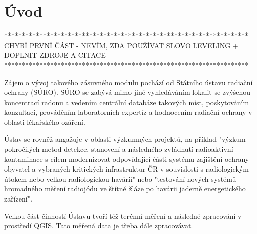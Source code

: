 \chapter{Úvod}
\label{1-uvod}

*********************************************************************
CHYBÍ PRVNÍ ČÁST - NEVÍM, ZDA POUŽÍVAT SLOVO LEVELING + DOPLNIT ZDROJE A CITACE
*********************************************************************

Zájem o vývoj takového zásuvného modulu pochází od Státního ústavu radiační ochrany (SÚRO). SÚRO se zabývá mimo jiné vyhledáváním lokalit se zvýšenou koncentrací radonu a vedením centrální databáze takových míst, poskytováním konzultací, prováděním laboratorních expertíz a hodnocením radiační ochrany v oblasti lékařského ozáření. 

Ústav se rovněž angažuje v oblasti výzkumných projektů, na příklad "výzkum pokročilých metod detekce, stanovení a následného zvládnutí radioaktivní kontaminace s cílem modernizovat odpovídající části systému zajištění ochrany obyvatel a vybraných kritických infrastruktur ČR v souvislosti s radiologickým útokem nebo velkou radiologickou havárií" nebo "testování nových systémů hromadného měření radiojódu ve štítné žláze po havárii jaderně energetického zařízení". 

Velkou část činností Ústavu tvoří též terénní měření a následné zpracování v prostředí QGIS. Tato měřená data je třeba dále zpracovávat.


